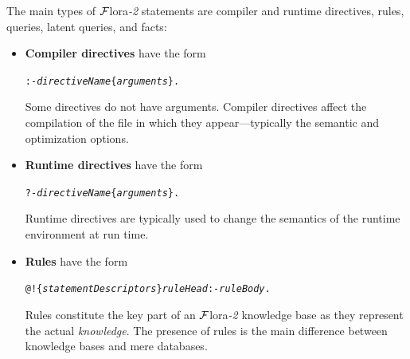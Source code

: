 \documentclass[11pt]{article}
\newcommand{\FLSYSTEM}{{\mbox{\sc ${\cal F}${lora}\rm\emph{-2}}}\xspace}
\begin{document}
The main types of \FLSYSTEM statements are compiler and runtime directives,
rules, queries, latent queries, and facts:
\begin{itemize}
\item  \textbf{Compiler directives} have the form\\
\begin{alltt}
     :- \emph{directiveName}\{\emph{arguments}\}. 
\end{alltt}
  Some directives do not have arguments. Compiler directives affect the
  compilation of the file in which they appear---typically the
  semantic and optimization options.
\item \textbf{Runtime directives} have the form\\  
\begin{alltt}
     ?- \emph{directiveName}\{\emph{arguments}\}. 
\end{alltt}
  Runtime directives are typically used to change the semantics of the
  runtime environment at run time.
\item \textbf{Rules} have the form\\
\begin{alltt}
     @!\{\emph{statementDescriptors}\}  \emph{ruleHead}  :-  \emph{ruleBody}. 
\end{alltt}
  Rules constitute the key part of an \FLSYSTEM knowledge base
  as they represent the actual \emph{knowledge}.
  The presence of rules is the main difference between knowledge bases and
  mere databases.


\end{itemize}
\end{document}
